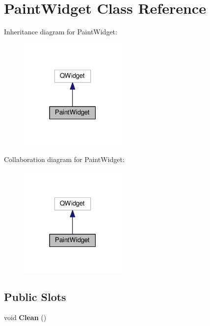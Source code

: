 \hypertarget{class_paint_widget}{}\section{Paint\+Widget Class Reference}
\label{class_paint_widget}


Inheritance diagram for Paint\+Widget\+:\nopagebreak
\begin{figure}[H]
\begin{center}
\leavevmode
\includegraphics[width=150pt]{class_paint_widget__inherit__graph}
\end{center}
\end{figure}


Collaboration diagram for Paint\+Widget\+:\nopagebreak
\begin{figure}[H]
\begin{center}
\leavevmode
\includegraphics[width=150pt]{class_paint_widget__coll__graph}
\end{center}
\end{figure}
\subsection*{Public Slots}
\begin{DoxyCompactItemize}
\item 
void {\bfseries Clean} ()\hypertarget{class_paint_widget_a5ebf42105842c3f4da64e8482a5a0b74}{}\label{class_paint_widget_a5ebf42105842c3f4da64e8482a5a0b74}

\end{DoxyCompactItemize}
